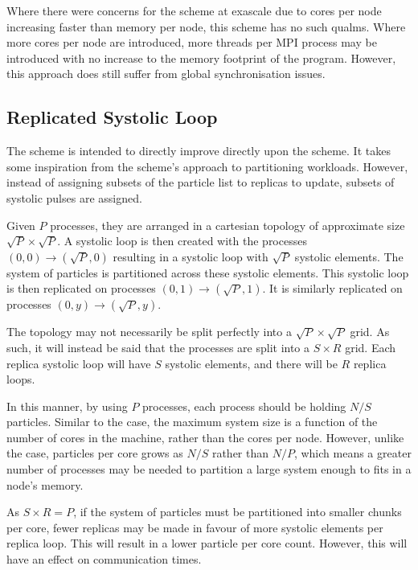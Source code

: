 Where there were concerns for the \replicateddata{} scheme at exascale
due to cores per node increasing faster than memory per node,
this scheme has no such qualms.
%
Where more cores per node are introduced,
more \openmp{} threads per MPI process
may be introduced with no increase to
the memory footprint of the program.
%
However, this approach does still suffer from global synchronisation issues.



\subsection{Replicated Systolic Loop}

%
The \replicatedsystolicloop{} scheme is intended to directly improve directly
upon the \systolicloop{} scheme.
%
It takes some inspiration from the \replicateddata{} scheme's approach
to partitioning workloads.
%
However, instead of assigning subsets of the particle list to replicas
to update, subsets of systolic pulses are assigned.

Given $P$ processes, they are arranged in a cartesian topology of
approximate size $\sqrt{P} \times{} \sqrt{P}$.
%
A systolic loop is then created with the processes
$(0,0) \rightarrow{} (\sqrt{P}, 0)$
resulting in a systolic loop with $\sqrt{P}$ systolic elements.
%
The system of particles is partitioned across these systolic elements.
%
This systolic loop is then replicated on processes
$(0,1) \rightarrow{} (\sqrt{P}, 1)$.
%
It is similarly replicated on processes $(0,y) \rightarrow{} (\sqrt{P},y)$.

The topology may not necessarily be split perfectly into a
$\sqrt{P} \times{} \sqrt{P}$ grid.
%
As such, it will instead be said that the processes are split into a
$S \times{} R$ grid.
%
Each replica systolic loop will have $S$ systolic elements,
and there will be $R$ replica loops.


In this manner, by using $P$ processes, each process should be holding
$N/S$ particles.
%
Similar to the \systolicloop{} case, the maximum system size is a function
of the number of cores in the machine, rather than the cores per node.
%
However, unlike the \systolicloop{} case, particles per core grows as
$N/S$ rather than $N/P$, which means a greater number of processes
may be needed to partition a large system enough to fits in
a node's memory.

As $S \times{} R = P$,
if the system of particles must be partitioned into
smaller chunks per core,
fewer replicas may be made in favour of more systolic elements
per replica loop.
%
This will result in a lower particle per core count.
%
However, this will have an effect on communication times.


